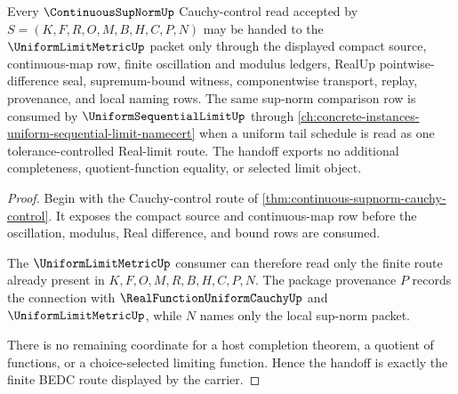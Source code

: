 \begin{theorem}
\label{thm:continuous-supnorm-uniform-limit-handoff}
Every $\ContinuousSupNormUp$ Cauchy-control read accepted by $S=(K,F,R,O,M,B,H,C,P,N)$ may be handed to the $\UniformLimitMetricUp$ packet only through the displayed compact source, continuous-map row, finite oscillation and modulus ledgers, RealUp pointwise-difference seal, supremum-bound witness, componentwise transport, replay, provenance, and local naming rows. The same sup-norm comparison row is consumed by $\UniformSequentialLimitUp$ through \autoref{ch:concrete-instances-uniform-sequential-limit-namecert} when a uniform tail schedule is read as one tolerance-controlled Real-limit route. The handoff exports no additional completeness, quotient-function equality, or selected limit object.
\end{theorem}
\begin{proof}
Begin with the Cauchy-control route of \autoref{thm:continuous-supnorm-cauchy-control}. It exposes the compact source and continuous-map row before the oscillation, modulus, Real difference, and bound rows are consumed.

The $\UniformLimitMetricUp$ consumer can therefore read only the finite route already present in $K,F,O,M,R,B,H,C,P,N$. The package provenance $P$ records the connection with $\RealFunctionUniformCauchyUp$ and $\UniformLimitMetricUp$, while $N$ names only the local sup-norm packet.

There is no remaining coordinate for a host completion theorem, a quotient of functions, or a choice-selected limiting function. Hence the handoff is exactly the finite BEDC route displayed by the carrier.
\end{proof}


\begin{closurestatus}{\ContinuousSupNormUp}
  \theoryclosure{\seedClosure}
  \formalstatus{\unformalizedV}
\end{closurestatus}
